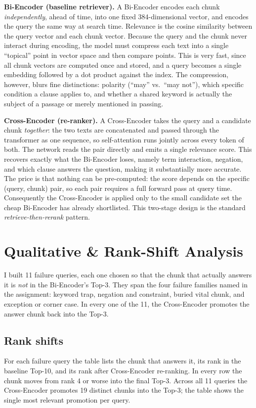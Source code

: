 \documentclass[11pt]{article}
\begin{document}
\textbf{Bi-Encoder (baseline retriever).} A Bi-Encoder encodes each chunk \emph{independently},
ahead of time, into one fixed 384-dimensional vector, and encodes the query the same way at search
time. Relevance is the cosine similarity between the query vector and each chunk vector. Because the
query and the chunk never interact during encoding, the model must compress each text into a single
``topical'' point in vector space and then compare points. This is very fast, since all chunk
vectors are computed once and stored, and a query becomes a single embedding followed by a dot
product against the index. The compression, however, blurs fine distinctions: polarity (``may''
vs.\ ``may not''), which specific condition a clause applies to, and whether a shared keyword is
actually the subject of a passage or merely mentioned in passing.

\textbf{Cross-Encoder (re-ranker).} A Cross-Encoder takes the query and a candidate chunk
\emph{together}: the two texts are concatenated and passed through the transformer as one sequence,
so self-attention runs jointly across every token of both. The network reads the pair directly and
emits a single relevance score. This recovers exactly what the Bi-Encoder loses, namely term
interaction, negation, and which clause answers the question, making it substantially more accurate.
The price is that nothing can be pre-computed: the score depends on the specific (query, chunk)
pair, so each pair requires a full forward pass at query time. Consequently the Cross-Encoder is
applied only to the small candidate set the cheap Bi-Encoder has already shortlisted. This two-stage
design is the standard \emph{retrieve-then-rerank} pattern.

\section{Qualitative \& Rank-Shift Analysis}

I built 11 failure queries, each one chosen so that the chunk that actually answers it is
\emph{not} in the Bi-Encoder's Top-3. They span the four failure families named in the assignment:
keyword trap, negation and constraint, buried vital chunk, and exception or corner case. In every
one of the 11, the Cross-Encoder promotes the answer chunk back into the Top-3.

\subsection{Rank shifts}
For each failure query the table lists the chunk that answers it, its rank in the baseline Top-10,
and its rank after Cross-Encoder re-ranking. In every row the chunk moves from rank 4 or worse into
the final Top-3. Across all 11 queries the Cross-Encoder promotes 19 distinct chunks into the Top-3;
the table shows the single most relevant promotion per query.
\end{document}
